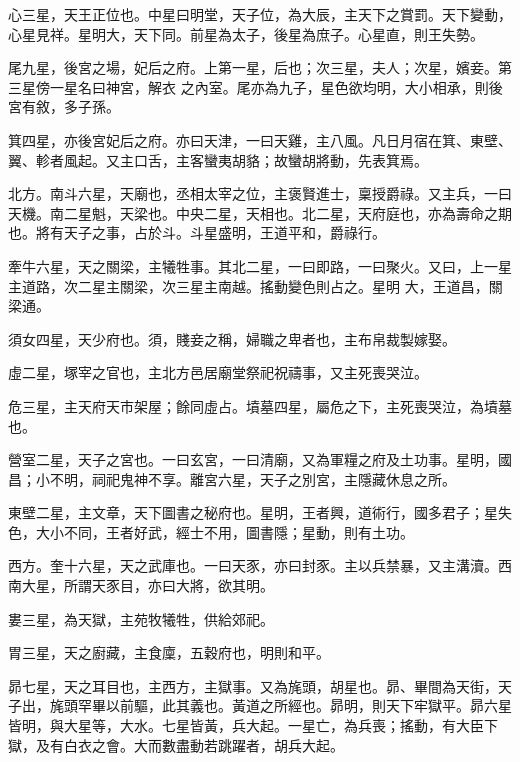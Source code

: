 \begin{pinyinscope}
{{ 心三星，天王正位也。中星曰明堂，天子位，為大辰，主天下之賞罰。天下變動，心星見祥。星明大，天下同。前星為太子，後星為庶子。心星直，則王失勢。



 尾九星，後宮之場，妃后之府。上第一星，后也；次三星，夫人；次星，嬪妾。第三星傍一星名曰神宮，解衣
 之內室。尾亦為九子，星色欲均明，大小相承，則後宮有敘，多子孫。



 箕四星，亦後宮妃后之府。亦曰天津，一曰天雞，主八風。凡日月宿在箕、東壁、翼、軫者風起。又主口舌，主客蠻夷胡貉；故蠻胡將動，先表箕焉。



 北方。南斗六星，天廟也，丞相太宰之位，主褒賢進士，稟授爵祿。又主兵，一曰天機。南二星魁，天梁也。中央二星，天相也。北二星，天府庭也，亦為壽命之期也。將有天子之事，占於斗。斗星盛明，王道平和，爵祿行。



 牽牛六星，天之關梁，主犧牲事。其北二星，一曰即路，一曰聚火。又曰，上一星主道路，次二星主關梁，次三星主南越。搖動變色則占之。星明
 大，王道昌，關梁通。



 須女四星，天少府也。須，賤妾之稱，婦職之卑者也，主布帛裁製嫁娶。



 虛二星，塚宰之官也，主北方邑居廟堂祭祀祝禱事，又主死喪哭泣。



 危三星，主天府天市架屋；餘同虛占。墳墓四星，屬危之下，主死喪哭泣，為墳墓也。



 營室二星，天子之宮也。一曰玄宮，一曰清廟，又為軍糧之府及土功事。星明，國昌；小不明，祠祀鬼神不享。離宮六星，天子之別宮，主隱藏休息之所。



 東壁二星，主文章，天下圖書之秘府也。星明，王者興，道術行，國多君子；星失色，大小不同，王者好武，經士不用，圖書隱；星動，則有土功。



 西方。奎十六星，天之武庫也。一曰天豕，亦曰封豕。主以兵禁暴，又主溝瀆。西南大星，所謂天豕目，亦曰大將，欲其明。



 婁三星，為天獄，主苑牧犧牲，供給郊祀。



 胃三星，天之廚藏，主食廩，五穀府也，明則和平。



 昴七星，天之耳目也，主西方，主獄事。又為旄頭，胡星也。昴、畢間為天街，天子出，旄頭罕畢以前驅，此其義也。黃道之所經也。昴明，則天下牢獄平。昴六星皆明，與大星等，大水。七星皆黃，兵大起。一星亡，為兵喪；搖動，有大臣下獄，及有白衣之會。大而數盡動若跳躍者，胡兵大起。



}}
\end{pinyinscope}
